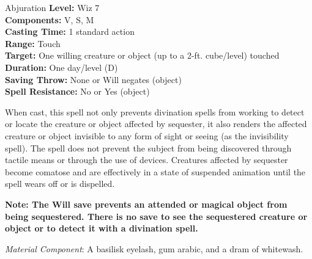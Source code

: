 {Abjuration}
{
	\textbf{Level:}
	Wiz 7\\
	\textbf{Components:}
	V, S, M\\
	\textbf{Casting Time:}
	1 standard action\\
	\textbf{Range:}
	Touch\\
	\textbf{Target:}
	One willing creature or object (up to a 2-ft. cube/level) touched\\
	\textbf{Duration:}
	One day/level (D)\\
	\textbf{Saving Throw:}
	None or Will negates (object)\\
	\textbf{Spell Resistance:}
	No or Yes (object)\\
}
{
	When cast, this spell not only prevents divination spells from working to detect or locate the creature or object affected by sequester, it also renders the affected creature or object invisible to any form of sight or seeing (as the invisibility spell). The spell does not prevent the subject from being discovered through tactile means or through the use of devices. Creatures affected by sequester become comatose and are effectively in a state of suspended animation until the spell wears off or is dispelled.

	\textbf{Note: The Will save prevents an attended or magical object from being sequestered. There is no save to see the sequestered creature or object or to detect it with a divination spell.}

	\textit{Material Component}:
	A basilisk eyelash, gum arabic, and a dram of whitewash.

}
